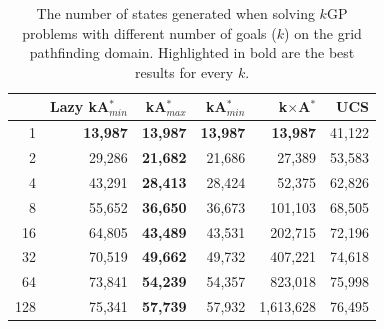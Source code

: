 \documentclass{aicom2e}
\newcommand{\kgs}{$k$GP}
\newcommand{\kastarmin}{kA$^*_{min}$}
\newcommand{\kastarmax}{kA$^*_{max}$}
\newcommand{\kxastar}{k$\times$A$^*$}
\begin{document}

\begin{table}[]
    \centering
    \begin{tabular}{|r|r|r|r|r|r|}
    \hline
        & \multicolumn{1}{c|}{Lazy \kastarmin{}} & \kastarmax &      \kastarmin       &  \kxastar & UCS       \\

        \hline
1                         & \textbf{13,987}                      & \textbf{13,987}           & \textbf{13,987}           & \textbf{13,987}                 & 41,122                      \\
2                         & 29,286                               & \textbf{21,682}           & 21,686                    & 27,389                          & 53,583                      \\
4                         & 43,291                               & \textbf{28,413}           & 28,424                    & 52,375                          & 62,826                      \\
8                         & 55,652                               & \textbf{36,650}           & 36,673                    & 101,103                         & 68,505                      \\
16                        & 64,805                               & \textbf{43,489}           & 43,531                    & 202,715                         & 72,196                      \\
32                        & 70,519                               & \textbf{49,662}           & 49,732                    & 407,221                         & 74,618                      \\
64                        & 73,841                               & \textbf{54,239}           & 54,357                    & 823,018                         & 75,998                      \\
128                       & 75,341                               & \textbf{57,739}           & 57,932                    & 1,613,628                       & 76,495\\
\hline
    \end{tabular}
    \caption{The number of states generated when solving \kgs{} problems with different number of goals ($k$) on the grid pathfinding domain. Highlighted in bold are the best results for every $k$.}
    \label{tab:pathfinding-generated}
\end{table}
\end{document}
